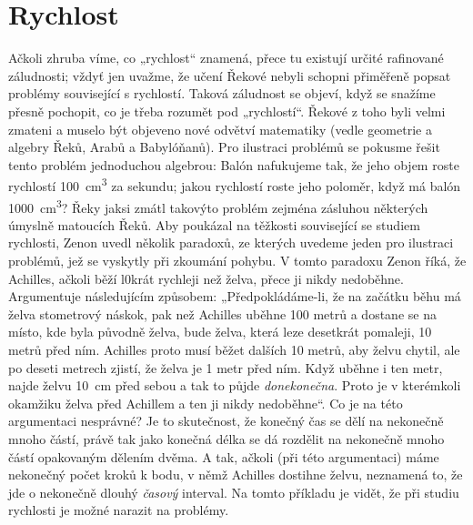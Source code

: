   \section{Rychlost}
    Ačkoli zhruba víme, co „rychlost“ znamená, přece tu existují určité rafinované záludnosti; 
    vždyť jen uvažme, že učení Řekové nebyli schopni přiměřeně popsat problémy související s 
    rychlostí. Taková záludnost se objeví, když se snažíme přesně pochopit, co je třeba rozumět pod 
    „rychlostí“. Řekové z toho byli velmi zmateni a muselo být objeveno nové odvětví matematiky 
    (vedle geometrie a algebry Řeků, Arabů a Babylóňanů). Pro ilustraci problémů se pokusme řešit 
    tento problém jednoduchou algebrou: Balón nafukujeme tak, že jeho objem roste rychlostí 
    \SI{100}{\cubic\cm} za sekundu; jakou rychlostí roste jeho poloměr, když má balón 
    \SI{1000}{\cubic\cm}? Řeky jaksi zmátl takovýto problém zejména zásluhou některých úmyslně 
    matoucích Řeků. Aby poukázal na těžkosti související se studiem rychlosti, Zenon uvedl několik 
    paradoxů, ze kterých uvedeme jeden pro ilustraci problémů, jež se vyskytly při zkoumání pohybu. 
    V tomto paradoxu Zenon říká, že Achilles, ačkoli běží l0krát rychleji než želva, přece ji nikdy 
    nedoběhne. Argumentuje následujícím způsobem: „Předpokládáme-li, že na začátku běhu má želva 
    stometrový náskok, pak než Achilles uběhne \num{100} metrů a dostane se na místo, kde byla 
    původně želva, bude želva, která leze desetkrát pomaleji, \num{10} metrů před ním. Achilles 
    proto musí běžet dalších \num{10} metrů, aby želvu chytil, ale po deseti metrech zjistí, že 
    želva je \num{1} metr před ním. Když uběhne i ten metr, najde želvu \SI{10}{\cm} před sebou a 
    tak to půjde \emph{donekonečna}. Proto je v kterémkoli okamžiku želva před Achillem a ten ji 
    nikdy nedoběhne“. Co je na této argumentaci nesprávné? Je to skutečnost, že konečný čas se dělí 
    na nekonečně mnoho částí, právě tak jako konečná délka se dá rozdělit na nekonečně mnoho částí 
    opakovaným dělením dvěma. A tak, ačkoli (při této argumentaci) máme nekonečný počet kroků k 
    bodu, v němž Achilles dostihne želvu, neznamená to, že jde o nekonečně dlouhý \emph{časový} 
    interval. Na tomto příkladu je vidět, že při studiu rychlosti je možné narazit na problémy.
    
